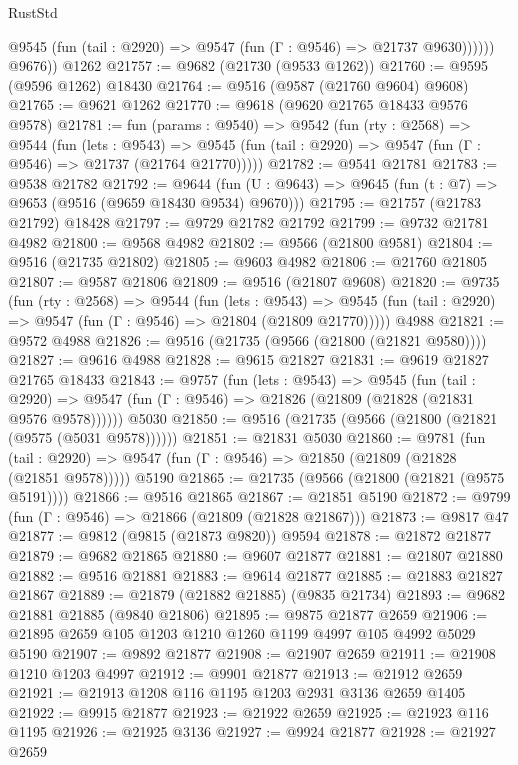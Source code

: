 \begin{lexlean}{RustStd}
\begin{coremodule}
              @9545 (fun (tail : @2920) => @9547 (fun (Γ : @9546) => @21737 @9630))))))
        @9676))
    @1262
@21757 := @9682 (@21730 (@9533 @1262))
@21760 := @9595 (@9596 @1262) @18430
@21764 := @9516 (@9587 (@21760 @9604) @9608)
@21765 := @9621 @1262
@21770 := @9618 (@9620 @21765 @18433 @9576 @9578)
@21781 := fun (params : @9540) =>
  @9542
    (fun (rty : @2568) =>
    @9544
      (fun (lets : @9543) =>
      @9545 (fun (tail : @2920) => @9547 (fun (Γ : @9546) => @21737 (@21764 @21770)))))
@21782 := @9541 @21781
@21783 := @9538 @21782
@21792 := @9644
    (fun (U : @9643) => @9645 (fun (t : @7) => @9653 (@9516 (@9659 @18430 @9534) @9670)))
@21795 := @21757 (@21783 @21792) @18428
@21797 := @9729 @21782 @21792
@21799 := @9732 @21781 @4982
@21800 := @9568 @4982
@21802 := @9566 (@21800 @9581)
@21804 := @9516 (@21735 @21802)
@21805 := @9603 @4982
@21806 := @21760 @21805
@21807 := @9587 @21806
@21809 := @9516 (@21807 @9608)
@21820 := @9735
    (fun (rty : @2568) =>
    @9544
      (fun (lets : @9543) =>
      @9545 (fun (tail : @2920) => @9547 (fun (Γ : @9546) => @21804 (@21809 @21770)))))
    @4988
@21821 := @9572 @4988
@21826 := @9516 (@21735 (@9566 (@21800 (@21821 @9580))))
@21827 := @9616 @4988
@21828 := @9615 @21827
@21831 := @9619 @21827 @21765 @18433
@21843 := @9757
    (fun (lets : @9543) =>
    @9545
      (fun (tail : @2920) =>
      @9547 (fun (Γ : @9546) => @21826 (@21809 (@21828 (@21831 @9576 @9578))))))
    @5030
@21850 := @9516 (@21735 (@9566 (@21800 (@21821 (@9575 (@5031 @9578))))))
@21851 := @21831 @5030
@21860 := @9781
    (fun (tail : @2920) => @9547 (fun (Γ : @9546) => @21850 (@21809 (@21828 (@21851 @9578)))))
    @5190
@21865 := @21735 (@9566 (@21800 (@21821 (@9575 @5191))))
@21866 := @9516 @21865
@21867 := @21851 @5190
@21872 := @9799 (fun (Γ : @9546) => @21866 (@21809 (@21828 @21867)))
@21873 := @9817 @47
@21877 := @9812 (@9815 (@21873 @9820)) @9594
@21878 := @21872 @21877
@21879 := @9682 @21865
@21880 := @9607 @21877
@21881 := @21807 @21880
@21882 := @9516 @21881
@21883 := @9614 @21877
@21885 := @21883 @21827 @21867
@21889 := @21879 (@21882 @21885) (@9835 @21734)
@21893 := @9682 @21881 @21885 (@9840 @21806)
@21895 := @9875 @21877 @2659
@21906 := @21895 @2659 @105 @1203 @1210 @1260 @1199 @4997 @105 @4992 @5029 @5190
@21907 := @9892 @21877
@21908 := @21907 @2659
@21911 := @21908 @1210 @1203 @4997
@21912 := @9901 @21877
@21913 := @21912 @2659
@21921 := @21913 @1208 @116 @1195 @1203 @2931 @3136 @2659 @1405
@21922 := @9915 @21877
@21923 := @21922 @2659
@21925 := @21923 @116 @1195
@21926 := @21925 @3136
@21927 := @9924 @21877
@21928 := @21927 @2659

\end{coremodule}
\end{lexlean}
